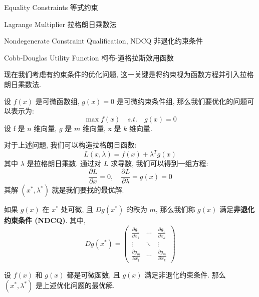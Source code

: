 \begin{introduction}[Keywords]
    \item Equality Constraints 等式约束
    \item Lagrange Multiplier 拉格朗日乘数法
    \item Nondegenerate Constraint Qualification, NDCQ 非退化约束条件
    \item Cobb-Douglas Utility Function 柯布-道格拉斯效用函数
\end{introduction}
\begin{note}
现在我们考虑有约束条件的优化问题, 这一关键是将约束视为函数方程并引入拉格朗日乘数法. 
\end{note}
\begin{definition}
    设 $f(x)$ 是可微函数组, $g(x) = 0$ 是可微约束条件组, 那么我们要优化的问题可以表示为:
    \begin{equation}
        \max f(x) \quad s.t. \quad g(x) = 0
    \end{equation}
    设 f 是 $n$ 维向量, $g$ 是 $m$ 维向量, x 是 $k$ 维向量. 
\end{definition}
\begin{definition}
    对于上述问题, 我们可以构造拉格朗日函数:
    \begin{equation}
        L(x, \lambda) = f(x) + \lambda^T g(x)
    \end{equation}
    其中 $\lambda$ 是拉格朗日乘数.
    通过对 $L$ 求导数, 我们可以得到一组方程:
    \begin{equation}
        \frac{\partial L}{\partial x} = 0, \quad \frac{\partial L}{\partial \lambda} = g(x) = 0
    \end{equation}
    其解 $(x^*, \lambda^*)$ 就是我们要找的最优解.
\end{definition}
\begin{definition}[NDCQ]
    如果 $g(x)$ 在 $x^*$ 处可微, 且 $Dg(x^*)$ 的秩为 $m$, 那么我们称 $g(x)$ 满足\textbf{非退化约束条件 (NDCQ)}. 
    其中, $$Dg(x^*) = \begin{pmatrix}
        \frac{\partial g_1}{\partial x_1} & \cdots & \frac{\partial g_1}{\partial x_k} \\
        \vdots & \ddots & \vdots \\
        \frac{\partial g_m}{\partial x_1} & \cdots & \frac{\partial g_m}{\partial x_k}
    \end{pmatrix}$$
\end{definition}
\begin{theorem}
    设 $f(x)$ 和 $g(x)$ 都是可微函数, 且 $g(x)$ 满足非退化约束条件. 那么 $(x^*, \lambda^*)$ 是上述优化问题的最优解.
\end{theorem}

